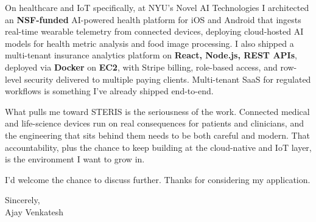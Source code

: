 \documentclass[letterpaper,11pt]{article}
\begin{document}
On healthcare and IoT specifically, at NYU's Novel AI Technologies I architected an \textbf{NSF-funded} AI-powered health platform for iOS and Android that ingests real-time wearable telemetry from connected devices, deploying cloud-hosted AI models for health metric analysis and food image processing. I also shipped a multi-tenant insurance analytics platform on \textbf{React, Node.js, REST APIs}, deployed via \textbf{Docker} on \textbf{EC2}, with Stripe billing, role-based access, and row-level security delivered to multiple paying clients. Multi-tenant SaaS for regulated workflows is something I've already shipped end-to-end.

What pulls me toward STERIS is the seriousness of the work. Connected medical and life-science devices run on real consequences for patients and clinicians, and the engineering that sits behind them needs to be both careful and modern. That accountability, plus the chance to keep building at the cloud-native and IoT layer, is the environment I want to grow in.

I'd welcome the chance to discuss further. Thanks for considering my application.

\vspace{12pt}

Sincerely, \\
Ajay Venkatesh
\end{document}
